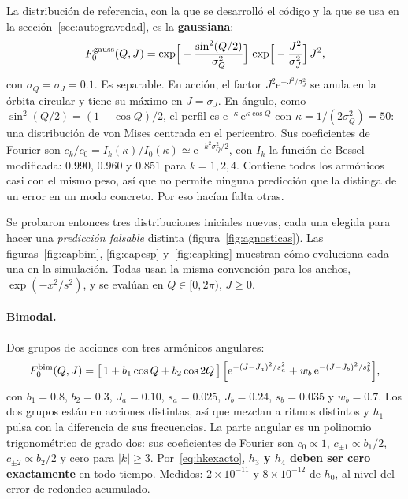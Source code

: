 \documentclass[11pt,a4paper]{article}
\newcommand{\ee}{\mathrm{e}}
\newcommand{\Jr}{J}
\newcommand{\Qr}{Q}
\theoremstyle{definition}
\begin{document}
La distribución de referencia, con la que se desarrolló el código y la que se usa en
la sección~\ref{sec:autogravedad}, es la \textbf{gaussiana}:
\begin{equation}
  F_0^{\rm gauss}(\Qr,\Jr) =
  \exp\!\Big[-\frac{\sin^2(\Qr/2)}{\sigma_Q^2}\Big]\,
  \exp\!\Big[-\frac{\Jr^2}{\sigma_J^2}\Big]\,\Jr^2 ,
  \label{eq:gauss}
\end{equation}
con $\sigma_Q=\sigma_J=0.1$. Es separable. En acción, el factor
$\Jr^2\ee^{-\Jr^2/\sigma_J^2}$ se anula en la órbita circular y tiene su máximo en
$\Jr=\sigma_J$. En ángulo, como $\sin^2(\Qr/2)=(1-\cos\Qr)/2$, el perfil es
$\ee^{-\kappa}\,\ee^{\kappa\cos\Qr}$ con $\kappa=1/(2\sigma_Q^2)=50$: una distribución de
von Mises centrada en el pericentro. Sus coeficientes de Fourier son
$c_k/c_0=I_k(\kappa)/I_0(\kappa)\simeq\ee^{-k^2\sigma_Q^2/2}$, con $I_k$ la función de
Bessel modificada: $0.990$, $0.960$ y $0.851$ para $k=1,2,4$. Contiene todos los
armónicos casi con el mismo peso, así que no permite ninguna predicción que la
distinga de un error en un modo concreto. Por eso hacían falta otras.

Se probaron entonces tres distribuciones iniciales nuevas, cada una elegida para hacer una
\emph{predicción falsable} distinta (figura~\ref{fig:agnosticas}). Las
figuras~\ref{fig:capbim}, \ref{fig:capesp} y~\ref{fig:capking} muestran cómo evoluciona
cada una en la simulación. Todas usan la
misma convención para los anchos, $\exp(-x^2/s^2)$, y se evalúan en
$\Qr\in[0,2\pi)$, $\Jr\ge0$.

\paragraph{Bimodal.} Dos grupos de acciones con tres armónicos angulares:
\begin{equation}
  F_0^{\rm bim}(\Qr,\Jr) =
  \big[\,1 + b_1\cos\Qr + b_2\cos 2\Qr\,\big]\,
  \Big[\ee^{-(\Jr-\Jr_a)^2/s_a^2} + w_b\,\ee^{-(\Jr-\Jr_b)^2/s_b^2}\Big],
  \label{eq:bimodal}
\end{equation}
con $b_1=0.8$, $b_2=0.3$, $\Jr_a=0.10$, $s_a=0.025$, $\Jr_b=0.24$, $s_b=0.035$ y
$w_b=0.7$. Los dos grupos están en acciones distintas, así que mezclan a ritmos
distintos y $h_1$ pulsa con la diferencia de sus frecuencias. La parte angular es
un polinomio trigonométrico de grado dos: sus coeficientes de Fourier son
$c_0\propto1$, $c_{\pm1}\propto b_1/2$, $c_{\pm2}\propto b_2/2$ y cero para
$|k|\ge3$. Por~\eqref{eq:hkexacto}, \textbf{$h_3$ y $h_4$ deben ser cero
exactamente} en todo tiempo. Medidos: $2\times10^{-11}$ y $8\times10^{-12}$ de
$h_0$, al nivel del error de redondeo acumulado.
\end{document}
